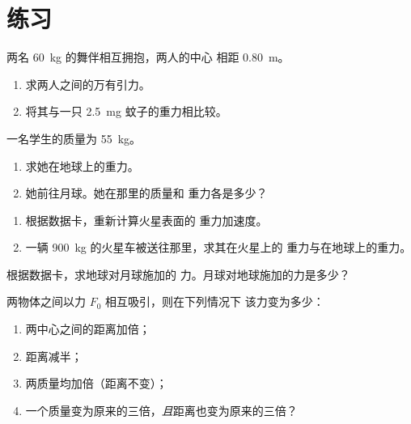 \section{练习}

\begin{exercise}[$\star$]\label{exo:g10:universal-gravitation:1}
两名 \qty{60}{kg} 的舞伴相互拥抱，两人的中心
相距 \qty{0.80}{m}。
\begin{enumerate}
  \item 求两人之间的万有引力。
  \item 将其与一只 \qty{2.5}{mg} 蚊子的重力相比较。
\end{enumerate}
\end{exercise}

\begin{exercise}[$\star$]\label{exo:g10:universal-gravitation:2}
一名学生的质量为 \qty{55}{kg}。
\begin{enumerate}
  \item 求她在地球上的重力。
  \item 她前往月球。她在那里的质量和
        重力各是多少？
\end{enumerate}
\end{exercise}

\begin{exercise}[$\star$]\label{exo:g10:universal-gravitation:3}
\begin{enumerate}
  \item 根据数据卡，重新计算火星表面的
        重力加速度。
  \item 一辆 \qty{900}{kg} 的火星车被送往那里，求其在火星上的
        重力与在地球上的重力。
\end{enumerate}
\end{exercise}

\begin{exercise}[$\star$]\label{exo:g10:universal-gravitation:4}
根据数据卡，求地球对月球施加的
力。月球对地球施加的力是多少？
\end{exercise}

\begin{exercise}[$\star$]\label{exo:g10:universal-gravitation:5}
两物体之间以力 $F_0$ 相互吸引，则在下列情况下
该力变为多少：
\begin{enumerate}
  \item 两中心之间的距离加倍；
  \item 距离减半；
  \item 两质量均加倍（距离不变）；
  \item 一个质量变为原来的三倍，\emph{且}距离也变为原来的三倍？
\end{enumerate}
\end{exercise}

